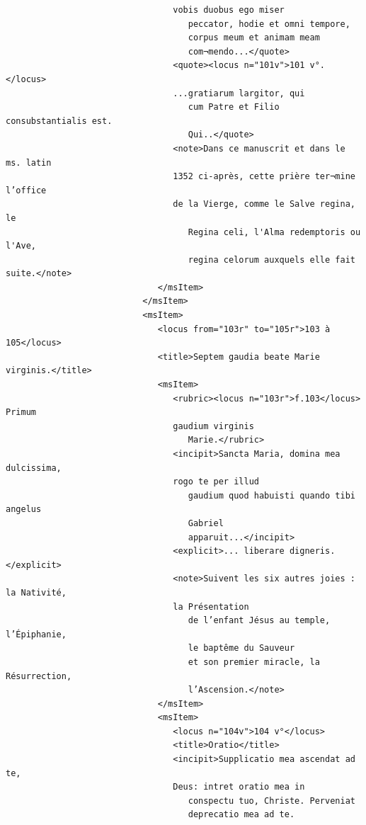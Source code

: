 \documentclass[a4paper,12pt,twoside]{book}
\begin{document}
\begin{verbatim}
                                 vobis duobus ego miser
                                    peccator, hodie et omni tempore, 
                                    corpus meum et animam meam
                                    com¬mendo...</quote>
                                 <quote><locus n="101v">101 v°.</locus> 
                                 ...gratiarum largitor, qui
                                    cum Patre et Filio consubstantialis est. 
                                    Qui..</quote>
                                 <note>Dans ce manuscrit et dans le ms. latin 
                                 1352 ci-après, cette prière ter¬mine l’office 
                                 de la Vierge, comme le Salve regina, le
                                    Regina celi, l'Alma redemptoris ou l'Ave, 
                                    regina celorum auxquels elle fait suite.</note>
                              </msItem>
                           </msItem>
                           <msItem>
                              <locus from="103r" to="105r">103 à 105</locus>
                              <title>Septem gaudia beate Marie virginis.</title>
                              <msItem>
                                 <rubric><locus n="103r">f.103</locus> Primum 
                                 gaudium virginis
                                    Marie.</rubric>
                                 <incipit>Sancta Maria, domina mea dulcissima, 
                                 rogo te per illud
                                    gaudium quod habuisti quando tibi angelus 
                                    Gabriel
                                    apparuit...</incipit>
                                 <explicit>... liberare digneris.</explicit>
                                 <note>Suivent les six autres joies : la Nativité,
                                 la Présentation
                                    de l’enfant Jésus au temple, l’Épiphanie, 
                                    le baptême du Sauveur
                                    et son premier miracle, la Résurrection, 
                                    l’Ascension.</note>
                              </msItem>
                              <msItem>
                                 <locus n="104v">104 v°</locus>
                                 <title>Oratio</title>
                                 <incipit>Supplicatio mea ascendat ad te, 
                                 Deus: intret oratio mea in
                                    conspectu tuo, Christe. Perveniat 
                                    deprecatio mea ad te.

\end{verbatim}
\end{document}
